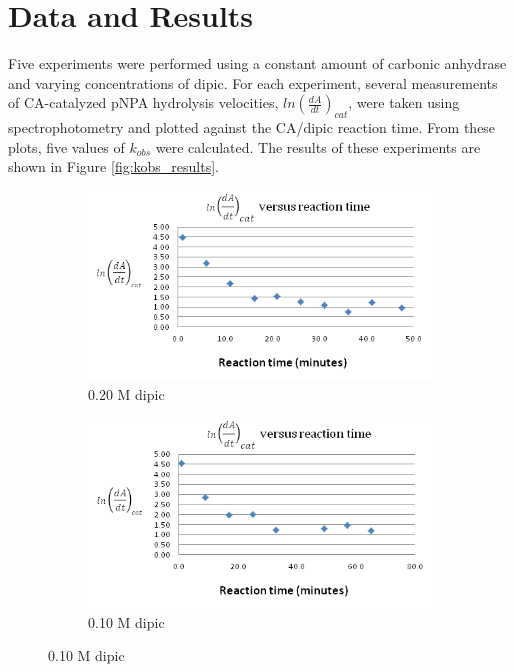 \section{Data and Results}
Five experiments were performed using a constant amount of carbonic anhydrase and varying concentrations of dipic. For each experiment, several measurements of CA-catalyzed pNPA hydrolysis velocities, $ln \left(\frac{dA}{dt}\right)_{cat}$, were taken using spectrophotometry and plotted against the CA/dipic reaction time. From these plots, five values of $k_{obs}$ were calculated. The results of these experiments are shown in Figure \ref{fig:kobs_results}.
\begin{figure}[h]
        \begin{subfigure}{0.5\textwidth}
                \includegraphics[width=\textwidth]{./Figures/20M_dipic_readings.png}
                \caption{0.20 M dipic}
                \label{fig:0.20M_dipic_readings}
        \end{subfigure}\begin{subfigure}{0.5\textwidth}
                \includegraphics[width=\textwidth]{./Figures/10M_dipic_readings.png}
                \caption{0.10 M dipic}

\end{subfigure}
\end{figure}
